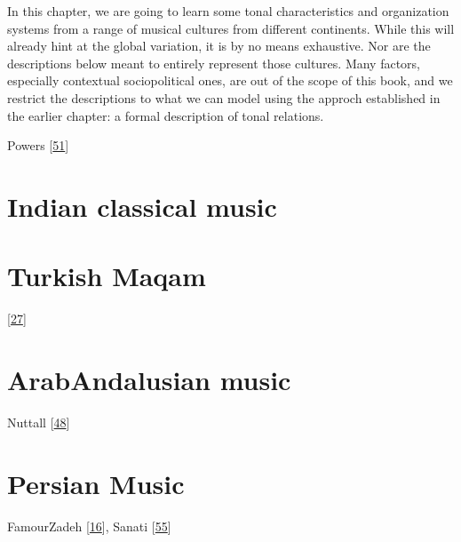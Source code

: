 \documentclass[letterpaper,10pt,english]{sphinxmanual}
\begin{document}
\sphinxAtStartPar
In this chapter, we are going to learn some tonal characteristics and organization systems from a range of
musical cultures from different continents. While this will already hint at the global variation,
it is by no means exhaustive. Nor are the descriptions below meant to entirely represent those cultures.
Many factors, especially contextual sociopolitical ones, are out of the scope of this book, and we
restrict the descriptions to what we can model using the approch established in the earlier chapter:
a formal description of tonal relations.

\sphinxAtStartPar
Powers  {[}\hyperlink{cite.8_bibliography:id23}{51}{]}


\section{Indian classical music}
\label{\detokenize{2_scales_modes:indian-classical-music}}

\section{Turkish Maqam}
\label{\detokenize{2_scales_modes:turkish-maqam}}
\sphinxAtStartPar
{} {[}\hyperlink{cite.8_bibliography:id58}{27}{]}


\section{Arab\sphinxhyphen{}Andalusian music}
\label{\detokenize{2_scales_modes:arab-andalusian-music}}
\sphinxAtStartPar
Nuttall  {[}\hyperlink{cite.8_bibliography:id77}{48}{]}


\section{Persian Music}
\label{\detokenize{2_scales_modes:persian-music}}
\sphinxAtStartPar
FamourZadeh {[}\hyperlink{cite.8_bibliography:id75}{16}{]}, Sanati {[}\hyperlink{cite.8_bibliography:id71}{55}{]}
\end{document}
